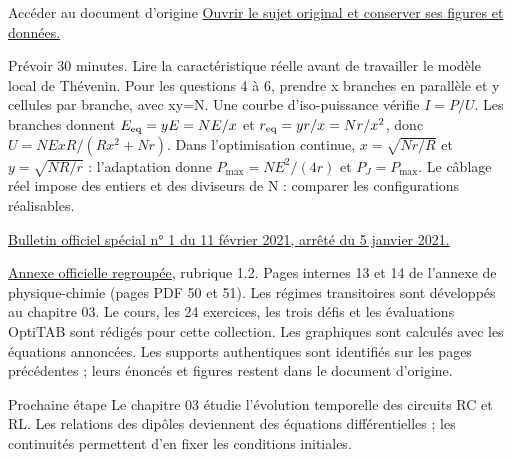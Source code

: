 \begin{loi}{Accéder au document d’origine}
\href{https://mpsi.schleck.ovh/fichiers/devoirs/ds02_enonce.pdf}{Ouvrir le sujet original et conserver ses figures et données.}
\end{loi}
Prévoir 30 minutes. Lire la caractéristique réelle avant de travailler le modèle local de Thévenin. Pour les questions 4 à 6, prendre x branches en parallèle et y cellules par branche, avec xy=N.
Une courbe d’iso-puissance vérifie $I=P/U$. Les branches donnent $E_{\rm eq}=yE=NE/x$ et $r_{\rm eq}=yr/x=Nr/x^2$, donc $U=NExR/(Rx^2+Nr)$. Dans l’optimisation continue, $x=\sqrt{Nr/R}$ et $y=\sqrt{NR/r}$ : l’adaptation donne $P_{\max}=NE^2/(4r)$ et $P_J=P_{\max}$. Le câblage réel impose des entiers et des diviseurs de N : comparer les configurations réalisables.

\href{https://www.education.gouv.fr/bo/21/Special1/ESRS2035779A.htm}{Bulletin officiel spécial n° 1 du 11 février 2021, arrêté du 5 janvier 2021.}\par
\href{https://cache.media.education.gouv.fr/file/SPE1-MEN-MESRI-4-2-2021/64/8/spe779_annexe_1373648.pdf}{Annexe officielle regroupée}, rubrique 1.2. Pages internes 13 et 14 de l’annexe de physique-chimie (pages PDF 50 et 51). Les régimes transitoires sont développés au chapitre 03.
Le cours, les 24 exercices, les trois défis et les évaluations OptiTAB sont rédigés pour cette collection. Les graphiques sont calculés avec les équations annoncées. Les supports authentiques sont identifiés sur les pages précédentes ; leurs énoncés et figures restent dans le document d’origine.
\begin{methode}{Prochaine étape}
Le chapitre 03 étudie l’évolution temporelle des circuits RC et RL. Les relations des dipôles deviennent des équations différentielles ; les continuités permettent d’en fixer les conditions initiales.
\end{methode}


